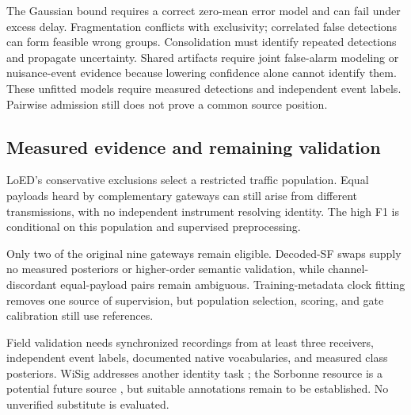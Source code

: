 The Gaussian bound requires a correct zero-mean error model and can fail under excess delay. Fragmentation conflicts with exclusivity; correlated false detections can form feasible wrong groups. Consolidation must identify repeated detections and propagate uncertainty. Shared artifacts require joint false-alarm modeling or nuisance-event evidence because lowering confidence alone cannot identify them. These unfitted models require measured detections and independent event labels. Pairwise admission still does not prove a common source position.

\subsection{Measured evidence and remaining validation}
LoED's conservative exclusions select a restricted traffic population. Equal payloads heard by complementary gateways can still arise from different transmissions, with no independent instrument resolving identity. The high F1 is conditional on this population and supervised preprocessing.

Only two of the original nine gateways remain eligible. Decoded-SF swaps supply no measured posteriors or higher-order semantic validation, while channel-discordant equal-payload pairs remain ambiguous. Training-metadata clock fitting removes one source of supervision, but population selection, scoring, and gate calibration still use references.

Field validation needs synchronized recordings from at least three receivers, independent event labels, documented native vocabularies, and measured class posteriors. WiSig addresses another identity task \cite{wisig}; the Sorbonne resource is a potential future source \cite{sorbonne2025,syed2023sniffer}, but suitable annotations remain to be established. No unverified substitute is evaluated.
